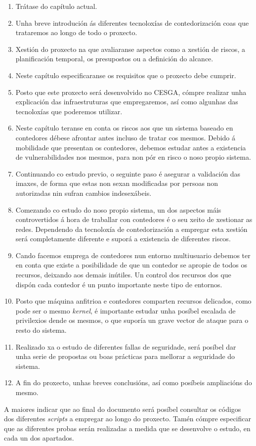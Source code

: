 \begin{enumerate}[{Capítulo }1: ]
    \item Trátase do capítulo actual.
    \item Unha breve introdución ás diferentes tecnoloxías de contedorización coas que trataremos ao longo de todo o proxecto.
    \item Xestión do proxecto na que avaliaranse aspectos como a xestión de riscos, a planificación temporal, os presupostos ou a definición do alcance.
    \item Neste capítulo especificaranse os requisitos que o proxecto debe cumprir.
    \item Posto que este proxecto será desenvolvido no \gls{CESGA}, cómpre realizar unha explicación das infraestruturas que empregaremos, así como algunhas das tecnoloxías que poderemos utilizar.
    \item Neste capítulo teranse en conta os riscos aos que un sistema baseado en contedores débese afrontar antes incluso de tratar cos mesmos. Debido á mobilidade que presentan os contedores, debemos estudar antes a existencia de vulnerabilidades nos mesmos, para non pór en risco o noso propio sistema.
    \item Continuando co estudo previo, o seguinte paso é asegurar a validación das imaxes, de forma que estas non sexan modificadas por persoas non autorizadas nin sufran cambios indesexábeis.
    \item Comezando co estudo do noso propio sistema, un dos aspectos máis controvertidos á hora de traballar con contedores é o seu xeito de xestionar as redes. Dependendo da tecnoloxía de contedorización a empregar esta xestión será completamente diferente e suporá a existencia de diferentes riscos.
    \item Cando facemos emprega de contedores nun entorno multiusuario debemos ter en conta que existe a posibilidade de que un contedor se apropie de todos os recursos, deixando aos demais inútiles. Un control dos recursos dos que dispón cada contedor é un punto importante neste tipo de entornos.
    \item Posto que máquina anfitrioa e contedores comparten recursos delicados, como pode ser o mesmo \textit{kernel}, é importante estudar unha posíbel escalada de privilexios dende os mesmos, o que suporía un grave vector de ataque para o resto do sistema.
    \item Realizado xa o estudo de diferentes fallas de seguridade, será posíbel dar unha serie de propostas ou boas prácticas para mellorar a seguridade do sistema.
    \item A fin do proxecto, unhas breves conclusións, así como posíbeis ampliacións do mesmo.
\end{enumerate} 

A maiores indicar que ao final do documento será posíbel consultar os códigos dos diferentes \textit{scripts} a empregar ao longo do proxecto. Tamén cómpre especificar que as diferentes probas serán realizadas a medida que se desenvolve o estudo, en cada un dos apartados.
